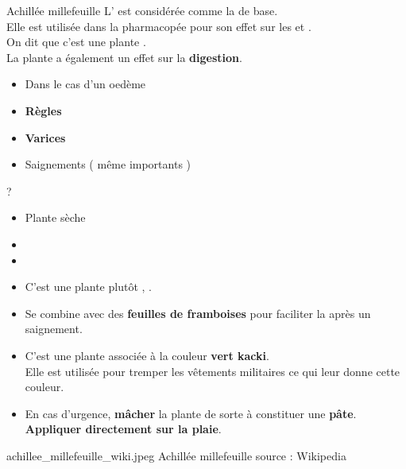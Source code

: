 \ficheidentiteplante
{Achillée millefeuille}
{%
    L' est considérée comme la  de base.\\ 
    Elle est utilisée dans la pharmacopée pour son effet sur les  et .\\
    On dit que c'est une plante .\\

    La plante a également un effet sur la \textbf{digestion}.
}
{%
    \begin{itemize}[label = \bcplume]
        \item Dans le cas d'un oedème
        \item \textbf{Règles}
        \item \textbf{Varices}
        \item Saignements ( même importants )
    \end{itemize}
}
{%
    ?
}
{%
    \begin{itemize}[label = \bccrayon]
        \item Plante sèche
        \item {}
        \item {}
    \end{itemize}
}{%
    \begin{Remarque}

        \begin{itemize}[label = \bcplume]
            \item C'est une plante plutôt , .
            \item Se combine avec des \textbf{feuilles de framboises} pour faciliter la  après un saignement.
            \item C'est une plante  associée à la couleur \textbf{vert kacki}.\\Elle est utilisée pour tremper les vêtements militaires ce qui leur donne cette couleur. 
            \item[\bcattention] En cas d'urgence, \textbf{mâcher} la plante de sorte à constituer une \textbf{pâte}.\\ \textbf{Appliquer directement sur la plaie}.
        \end{itemize}
    \end{Remarque}
}
{%
    achillee_millefeuille_wiki.jpeg
}
{%
    Achillée millefeuille
}
{%
    source : Wikipedia 
}
